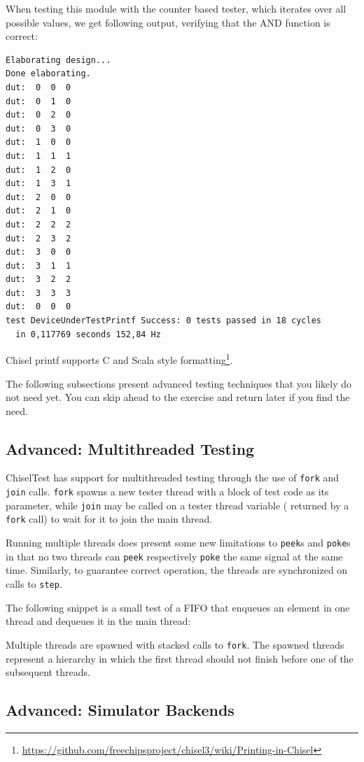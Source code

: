 \documentclass[%
    10pt,
    headinclude, footexclude,
    openright, %
    notitlepage,
    cleardoubleempty,
    headsepline,
    pointlessnumbers,
    bibtotoc, idxtotoc,
    ]{scrbook}
\newcommand{\code}[1]{{\small{\texttt{#1}}}}
\newcommand{\myref}[2]{\href{#1}{#2}}
\renewcommand{\myref}[2]{{#2}{\footnote{\url{#1}}}}
\begin{document}
\noindent When testing this module with the counter based tester, which iterates over all possible
values, we get following output, verifying that the AND function is correct:

\begin{verbatim}
Elaborating design...
Done elaborating.
dut:  0  0  0
dut:  0  1  0
dut:  0  2  0
dut:  0  3  0
dut:  1  0  0
dut:  1  1  1
dut:  1  2  0
dut:  1  3  1
dut:  2  0  0
dut:  2  1  0
dut:  2  2  2
dut:  2  3  2
dut:  3  0  0
dut:  3  1  1
dut:  3  2  2
dut:  3  3  3
dut:  0  0  0
test DeviceUnderTestPrintf Success: 0 tests passed in 18 cycles
  in 0,117769 seconds 152,84 Hz
\end{verbatim}

Chisel printf supports
\myref{https://github.com/freechipsproject/chisel3/wiki/Printing-in-Chisel}{C and Scala style formatting}.

The following subsections present advanced testing techniques that you likely do 
not need yet. You can skip ahead to the exercise and return later if you find the need.

\subsection{Advanced: Multithreaded Testing}

ChiselTest has support for multithreaded testing through the use of \code{fork} and 
\code{join} calls. \code{fork} spawns a new tester thread with a block of test code 
as its parameter, while \code{join} may be called on a tester thread variable (
returned by a \code{fork} call) to wait for it to join the main thread. 

Running multiple threads does present some new limitations to \code{peek}s and 
\code{poke}s in that no two threads can \code{peek} respectively \code{poke} the 
same signal at the same time. Similarly, to guarantee correct operation, the threads 
are synchronized on calls to \code{step}.

The following snippet is a small test of a FIFO that enqueues an element in one thread 
and dequeues it in the main thread:


Multiple threads are spawned with stacked calls to \code{fork}. The spawned threads 
represent a hierarchy in which the first thread should not finish before one of the 
subsequent threads.

\subsection{Advanced: Simulator Backends}
\end{document}
